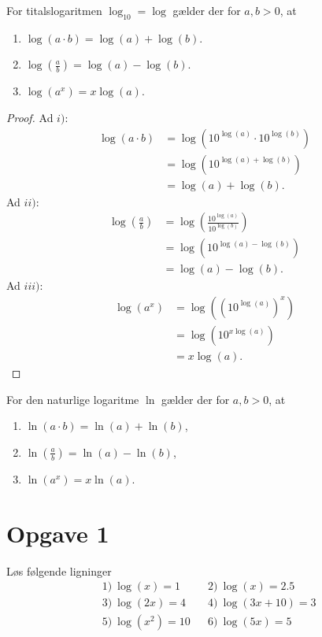 \begin{setn}
For titalslogaritmen $\log_{10} =\log$ gælder der for $a,b>0$, at 
\begin{enumerate}
\item $\log(a\cdot b) = \log(a) + \log(b)$. 
\item $\log\left(\frac{a}{b}\right) = \log(a)-\log(b)$.
\item $\log(a^x) = x\log(a)$.
\end{enumerate} 
\end{setn}
\begin{proof}
Ad $i)$:
\begin{align*}
\log(a\cdot b) &= \log(10^{\log(a)}\cdot 10^{\log(b)})\\
&= \log(10^{\log(a)+\log(b)})\\
&= \log(a)+\log(b).
\end{align*}
Ad $ii)$:
\begin{align*}
\log\left(\frac{a}{b}\right) &= \log \left(\frac{10^{\log(a)}}{10^{\log(b)}}\right)\\
&= \log(10^{\log(a)-\log(b)})\\
&= \log(a)-\log(b).
\end{align*}
Ad $iii)$:
\begin{align*}
\log(a^x) &= \log((10^{\log(a)})^x)\\
&= \log(10^{x\log(a)})\\
&= x\log(a).
\end{align*}
\end{proof}
\begin{setn}
For den naturlige logaritme $\ln$ gælder der for $a,b>0$, at
\begin{enumerate}[label=\roman*)]
\item $\ln(a\cdot b) = \ln(a) + \ln(b)$,
\item $\ln(\frac{a}{b}) = \ln(a)-\ln(b)$,
\item $\ln(a^x) = x\ln(a)$.
\end{enumerate}
\end{setn}
\section*{Opgave 1}
Løs følgende ligninger
\begin{align*}
&1) \  \log(x) = 1  &&2) \ \log(x) = 2.5    \\
&3) \ \log(2x) = 4   &&4) \ \log(3x+10)=3    \\
&5) \ \log(x^2) = 10   &&6) \  \log(5x) = 5    \\
\end{align*}
